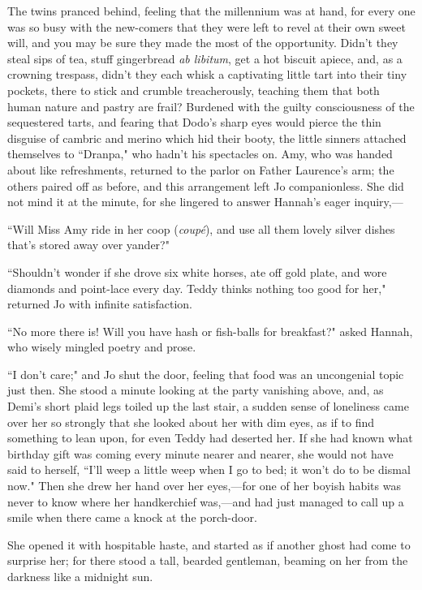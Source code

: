 The twins pranced behind, feeling that the millennium was at hand, for
every one was so busy with the new-comers that they were left to revel
at their own sweet will, and you may be sure they made the most of the
opportunity. Didn't they steal sips of tea, stuff
gingerbread \emph{ab libitum}, get a hot biscuit apiece, and, as a
crowning trespass, didn't they each whisk a captivating
little tart into their tiny pockets, there to stick and crumble
treacherously, teaching them that both human nature and pastry are
frail? Burdened with the guilty consciousness of the sequestered tarts,
and fearing that Dodo's sharp eyes would pierce the thin
disguise of cambric and merino which hid their booty, the little sinners
attached themselves to ``Dranpa," who hadn't his
spectacles on. Amy, who was handed about like refreshments, returned to
the parlor on Father Laurence's arm; the others paired
off as before, and this arrangement left Jo companionless. She did not
mind it at the minute, for she lingered to answer
Hannah's eager inquiry,---

``Will Miss Amy ride in her coop (\emph{coupé}), and use all them lovely
silver dishes that's stored away over yander?"

``Shouldn't wonder if she drove six white horses, ate off
gold plate, and wore diamonds and point-lace every day. Teddy thinks
nothing too good for her," returned Jo with infinite satisfaction.

``No more there is! Will you have hash or fish-balls for breakfast?"
asked Hannah, who wisely mingled poetry and prose.

``I don't care;" and Jo shut the door, feeling that food
was an uncongenial topic just then. She stood a minute looking at the
party vanishing above, and, as Demi's short plaid legs
toiled up the last stair, a sudden sense of loneliness came over her so
strongly that she looked about her with dim eyes, as if to find
something to lean upon, for even Teddy had deserted her. If she had
known what birthday gift was coming every minute nearer and nearer, she
would not have said to herself, ``I'll weep a little weep
when I go to bed; it won't do to be dismal now." Then
she drew her hand over her eyes,---for one of her boyish habits was
never to know where her handkerchief was,---and had just managed to call
up a smile when there came a knock at the porch-door.

She opened it with hospitable haste, and started as if another ghost had
come to surprise her; for there stood a tall, bearded gentleman, beaming
on her from the darkness like a midnight sun.

